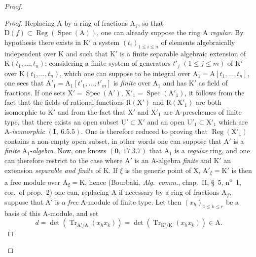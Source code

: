 \begin{proof}
\begin{proof}
Replacing $\mathrm{A}$ by a ring of fractions $\mathrm{A}_f$, so that $\mathrm{D}(f)\subset\operatorname{Reg}(\operatorname{Spec}(\mathrm{A}))$,
one can already suppose the ring $\mathrm{A}$ \emph{regular}. By hypothesis there exists in $\mathrm{K}'$ a system
$(t_i)_{1\leqslant i\leqslant n}$ of elements algebraically independent over $\mathrm{K}$ and such that $\mathrm{K}'$ is a
finite separable algebraic extension of $\mathrm{K}(t_1,\ldots,t_n)$; considering a finite system
of generators $t'_j$ $(1\leqslant j\leqslant m)$ of $\mathrm{K}'$ over $\mathrm{K}(t_1,\ldots,t_n)$, which one can suppose to be integral
over $\mathrm{A}_1=\mathrm{A}[t_1,\ldots,t_n]$, one sees that $\mathrm{A}'_1=\mathrm{A}_1[t'_1,\ldots,t'_m]$ is \emph{finite} over $\mathrm{A}_1$ and has $\mathrm{K}'$ as
field of fractions. If one sets $\mathrm{X}'=\operatorname{Spec}(\mathrm{A}')$, $\mathrm{X}'_1=\operatorname{Spec}(\mathrm{A}'_1)$, it follows from the fact that the fields
of rational functions $\mathrm{R}(\mathrm{X}')$ and $\mathrm{R}(\mathrm{X}'_1)$ are both isomorphic to $\mathrm{K}'$ and from the fact that $\mathrm{X}'$
and $\mathrm{X}'_1$ are $\mathrm{A}$-preschemes of finite type, that there exists an open subset $\mathrm{U}'\subset\mathrm{X}'$ and an open
$\mathrm{U}'_1\subset\mathrm{X}'_1$ which are $\mathrm{A}$-\emph{isomorphic} $(\mathbf{I},~6.5.5)$. One is therefore reduced to proving that $\operatorname{Reg}(\mathrm{X}'_1)$
contains a non-empty open subset, in other words one can suppose that $\mathrm{A}'$ is a \emph{finite} $\mathrm{A}_1$-\emph{algebra}. Now, one knows $(\mathbf{0},~17.3.7)$ that $\mathrm{A}_1$ is a \emph{regular} ring, and one can therefore restrict to the
case where $\mathrm{A}'$ is an $\mathrm{A}$-algebra \emph{finite} and $\mathrm{K}'$ an extension \emph{separable and finite} of $\mathrm{K}$. If $\xi$ is the
generic point of $\mathrm{X}$, $\mathrm{A}'_\xi=\mathrm{K}'$ is then a free module over $\mathrm{A}_\xi=\mathrm{K}$, hence (Bourbaki, \emph{Alg.\ comm.},
chap.~II, \S~5, n\textsuperscript{o}~1, cor.\ of prop.~2) one can, replacing $\mathrm{A}$ if necessary by a ring of fractions $\mathrm{A}_f$,
suppose that $\mathrm{A}'$ is a \emph{free} $\mathrm{A}$-module of finite type. Let then $(x_h)_{1\leqslant h\leqslant r}$ be a basis of
this $\mathrm{A}$-module, and set
\[
  d=\det(\operatorname{Tr}_{\mathrm{A}'/\mathrm{A}}(x_h x_k))=\det(\operatorname{Tr}_{\mathrm{K}'/\mathrm{K}}(x_h x_k))\in\mathrm{A}.
\]


\end{proof}
\end{proof}
